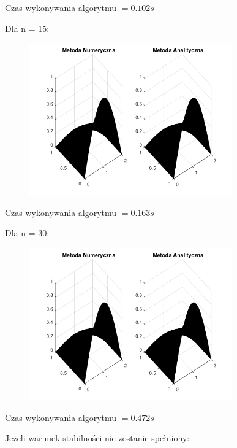 Czas wykonywania algorytmu $ = 0.102 s$

Dla n = 15:

\begin{figure}[!ht]
	\begin{center}
		\includegraphics[width=0.78\textwidth]{Lab7/charts/ftcs/15.png}
	\end{center}
\end{figure}

Czas wykonywania algorytmu $ = 0.163 s$

\newpage

Dla n = 30:

\begin{figure}[!ht]
	\begin{center}
		\includegraphics[width=0.78\textwidth]{Lab7/charts/ftcs/30.png}
	\end{center}
\end{figure}

Czas wykonywania algorytmu $ = 0.472 s$

Jeżeli warunek stabilności nie zostanie spełniony:

